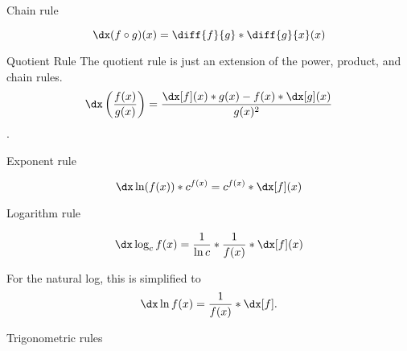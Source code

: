 \begin{psec}{Chain rule}\label{rule:derivative chain}

    \begin{equation}\label{eq:derivative chain}
        \dx (f \circ g)(x) = \diff{f}{g} * \diff{g}{x}(x)
    \end{equation}

\end{psec}

\begin{psec}{Quotient Rule}\label{rule:derivative quotient} The quotient rule is just an extension of the
    power, product, and chain rules.
    \begin{equation}
        \dx \left(\frac{f(x)}{g(x)}\right) = \frac{\dx[f](x) * g(x) - f(x) * \dx[g](x)
        }{g(x)^2}
    \end{equation}.

\end{psec}

\begin{psec}{Exponent rule}\label{rule:derivative exponent}

    \begin{equation}
        \dx \ln(f(x)) * c ^ {f(x)} = c ^ {f(x)} * \dx[f](x)
    \end{equation}

\end{psec}

\begin{psec}{Logarithm rule}\label{rule:derivative log}

    \begin{equation}
        \dx \log_c f(x) = \frac{1}{\ln c} * \frac{1}{f(x)} * \dx[f] (x)
    \end{equation}

    For the natural log, this is simplified to
    \begin{equation*}
        \dx \ln f(x) = \frac{1}{f(x)} * \dx[f].
    \end{equation*}

\end{psec}


\begin{psec}{Trigonometric rules}


\end{psec}
